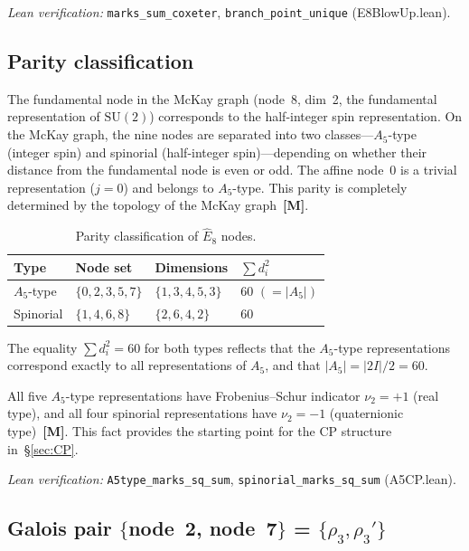 \documentclass[sn-mathphys-num,Numbered]{sn-jnl}
\theoremstyle{thmstyleone}
\theoremstyle{thmstylethree}
\newcommand{\SU}{\mathrm{SU}}
\newcommand{\Ehat}{\hat{E}}
\newcommand{\layerM}{\textbf{[M]}}
\begin{document}
\noindent\textit{Lean verification:}
\texttt{marks\_sum\_coxeter}, \texttt{branch\_point\_unique}
(E8BlowUp.lean).


\subsection{Parity classification}\label{sec:parity}

The fundamental node in the McKay graph (node~8, dim~2, the fundamental
representation of $\SU(2)$) corresponds to the half-integer spin
representation.  On the McKay graph, the nine nodes are separated into two
classes---$A_5$-type (integer spin) and spinorial (half-integer
spin)---depending on whether their distance from the fundamental node is even
or odd.  The affine node~0 is a trivial representation ($j = 0$) and belongs
to $A_5$-type.  This parity is completely determined by the topology of the
McKay graph~\layerM.

\begin{table}[htb]
\centering
\caption{Parity classification of $\Ehat_8$ nodes.}\label{tab:parity}
\begin{tabular}{llll}
\toprule
Type & Node set & Dimensions & $\sum d_i^2$ \\
\midrule
$A_5$-type & $\{0,2,3,5,7\}$ & $\{1,3,4,5,3\}$ & 60 $(= |A_5|)$ \\
Spinorial  & $\{1,4,6,8\}$   & $\{2,6,4,2\}$   & 60 \\
\bottomrule
\end{tabular}
\end{table}

The equality $\sum d_i^2 = 60$ for both types reflects that the $A_5$-type
representations correspond exactly to all representations of $A_5$, and that
$|A_5| = |2I|/2 = 60$.

All five $A_5$-type representations have Frobenius--Schur indicator $\nu_2 =
+1$ (real type), and all four spinorial representations have $\nu_2 = -1$
(quaternionic type)~\layerM.  This fact provides the starting point for the CP
structure in~\S\ref{sec:CP}.

\noindent\textit{Lean verification:}
\texttt{A5type\_marks\_sq\_sum}, \texttt{spinorial\_marks\_sq\_sum}
(A5CP.lean).


\subsection{Galois pair $\{$node~2, node~7$\}$ = $\{\rho_3, \rho_3'\}$}\label{sec:galois-pair}
\end{document}
